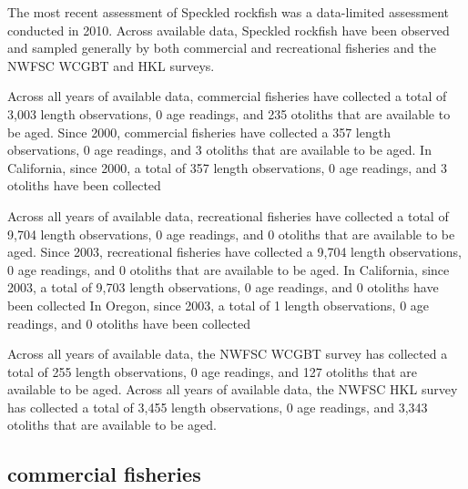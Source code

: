 \documentclass[11pt,
  english,
  letterpaper,
]{article}
\begin{document}
The most recent assessment of Speckled rockfish was a data-limited assessment conducted in 2010. Across available data, Speckled rockfish have been observed and sampled generally by both commercial and recreational fisheries and the NWFSC WCGBT and HKL surveys.

\leavevmode\tagmcend\tagstructend\par


Across all years of available data, commercial fisheries have collected a total of 3,003 length observations, 0 age readings, and 235 otoliths that are available to be aged. Since 2000, commercial fisheries have collected a 357 length observations, 0 age readings, and 3 otoliths that are available to be aged. In California, since 2000, a total of 357 length observations, 0 age readings, and 3 otoliths have been collected

\leavevmode\tagmcend\tagstructend\par


Across all years of available data, recreational fisheries have collected a total of 9,704 length observations, 0 age readings, and 0 otoliths that are available to be aged. Since 2003, recreational fisheries have collected a 9,704 length observations, 0 age readings, and 0 otoliths that are available to be aged. In California, since 2003, a total of 9,703 length observations, 0 age readings, and 0 otoliths have been collected In Oregon, since 2003, a total of 1 length observations, 0 age readings, and 0 otoliths have been collected

\leavevmode\tagmcend\tagstructend\par


Across all years of available data, the NWFSC WCGBT survey has collected a total of 255 length observations, 0 age readings, and 127 otoliths that are available to be aged. Across all years of available data, the NWFSC HKL survey has collected a total of 3,455 length observations, 0 age readings, and 3,343 otoliths that are available to be aged.

\leavevmode\tagmcend\tagstructend\par


\hypertarget{commercial-fisheries-50}{%
\subsection{commercial fisheries}\label{commercial-fisheries-50}}
\end{document}
